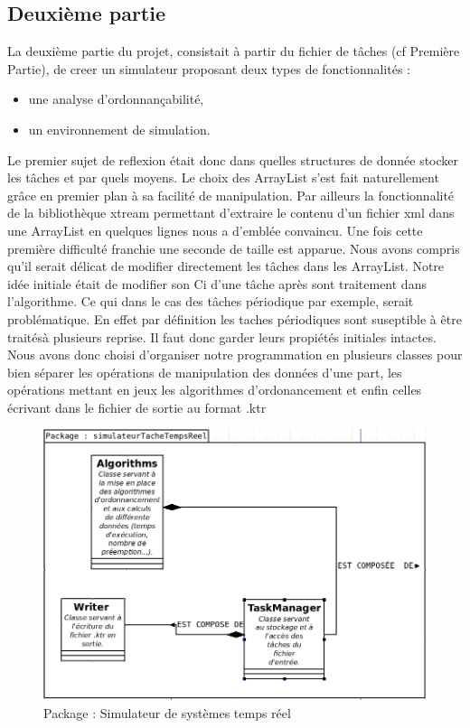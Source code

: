 \subsection{Deuxième partie}
La deuxième partie du projet, consistait à partir du fichier de tâches (cf Première Partie), de creer un simulateur proposant  deux types de fonctionnalités :
\begin{itemize}
\item
une analyse d'ordonnançabilité,
\item
un environnement de simulation.
\end{itemize}
Le premier sujet de reflexion était donc dans quelles structures de donnée stocker les tâches et par quels moyens. Le choix des ArrayList s'est fait naturellement grâce en premier plan à sa facilité de manipulation. Par ailleurs la fonctionnalité de la bibliothèque xtream permettant d'extraire le contenu d'un fichier xml dans une ArrayList en quelques lignes nous a d'emblée convaincu. Une fois cette première difficulté franchie une seconde de taille est apparue. Nous avons compris qu'il serait délicat de modifier directement les tâches dans les ArrayList. Notre idée initiale était de  modifier son Ci d'une  tâche après sont traitement dans l'algorithme. Ce qui dans le cas des tâches périodique par exemple, serait problématique. En effet par définition les taches périodiques  sont suseptible à être traitésà plusieurs reprise. Il faut donc garder leurs propiétés initiales intactes. Nous avons donc choisi d'organiser notre programmation en plusieurs classes pour bien séparer les opérations de manipulation des données d'une part, les opérations mettant en jeux les algorithmes d'ordonancement et enfin celles écrivant dans le fichier de sortie au format .ktr

   \begin{figure}[htbp]
  \centering
  \includegraphics[scale=0.60]{img/packsstr}
  \caption{Package : Simulateur de systèmes temps réel}
  \label{fig:sstr}
\end{figure}
\clearpage
